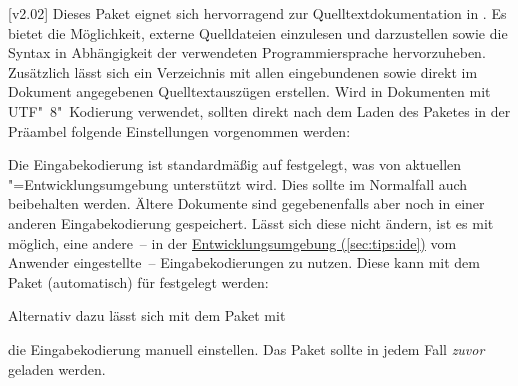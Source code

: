 \begin{DeclarePackages}
[v2.02]
  Dieses Paket eignet sich hervorragend zur Quelltextdokumentation in 
  . Es bietet die Möglichkeit, externe Quelldateien einzulesen 
  und darzustellen sowie die Syntax in Abhängigkeit der verwendeten 
  Programmiersprache hervorzuheben. Zusätzlich lässt sich ein Verzeichnis mit 
  allen eingebundenen sowie direkt im Dokument angegebenen Quelltextauszügen 
  erstellen. Wird  in Dokumenten mit UTF"~8"~Kodierung 
  verwendet, sollten direkt nach dem Laden des Paketes in der Präambel folgende 
  Einstellungen vorgenommen werden:
\begin{quoting}[rightmargin=0pt]
\begin{Code}
\end{Code}
\end{quoting}
  Die Eingabekodierung ist standardmäßig auf  festgelegt, was von 
  aktuellen "=Entwicklungsumgebung unterstützt wird. Dies sollte 
  im Normalfall auch beibehalten werden. Ältere Dokumente sind gegebenenfalls 
  aber noch in einer anderen Eingabekodierung gespeichert. Lässt sich diese 
  nicht ändern, ist es mit  möglich, eine andere~-- in der 
  \hyperref[sec:tips:ide]{Entwicklungsumgebung (\autoref*{sec:tips:ide})} 
  vom Anwender eingestellte~-- Eingabekodierungen zu nutzen. Diese kann mit dem 
  Paket  (automatisch) für  festgelegt werden:
\begin{quoting}[rightmargin=0pt]
\begin{Code}
\usepackage{selinput}
\end{Code}
\end{quoting}
  Alternativ dazu lässt sich mit dem Paket  mit
\begin{quoting}[rightmargin=0pt]
\end{quoting}
  die Eingabekodierung manuell einstellen. Das Paket  sollte 
  in jedem Fall \emph{zuvor} geladen werden.
\end{DeclarePackages}



